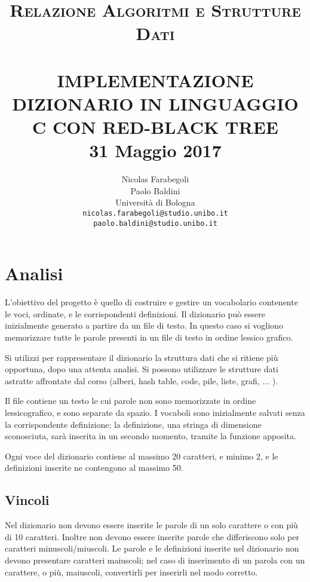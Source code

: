 \documentclass[paper=a4, fontsize=11pt,twoside]{scrartcl}   %
\title{ \normalsize \textsc{Relazione Algoritmi e Strutture Dati}    %
	\\[2.0cm]                               %
	\HRule{0.5pt} \\                        %
	\LARGE \textbf{\uppercase{Implementazione dizionario in linguaggio 
			C con Red-Black Tree}}    %
	\HRule{2pt} \\ [0.5cm]      %
	\normalsize 31 Maggio 2017          %
}
\author{
	Nicolas Farabegoli\\
	Paolo Baldini\\
	Università di Bologna\\  
	\texttt{nicolas.farabegoli@studio.unibo.it} \\
	\texttt{paolo.baldini@studio.unibo.it}\\
}
\makeatletter
\def\printtitle{%
	{\centering \@title\par}}
\def\printauthor{%
	{\centering \large \@author}}
\makeatother
\begin{document}
	\thispagestyle{empty}       %
	
	\printtitle                 %
	\vfill
	\printauthor                %
	\newpage
	
	\setcounter{page}{1}        %
	
	
	\section{Analisi}
		L'obiettivo del progetto è quello di costruire e gestire un vocabolario 
		contenente le voci, ordinate, e le corrispondenti definizioni. 
		Il dizionario può essere inizialmente generato a partire da un file di testo.  
		In questo caso si vogliono memorizzare tutte le parole presenti in un file di 
		testo in ordine lessico grafico.
		
		Si utilizzi per rappresentare il dizionario la struttura dati che si ritiene 
		più opportuna, dopo una attenta analisi. Si possono utilizzare le strutture 
		dati astratte affrontate dal corso (alberi, hash table, code, pile, liste, 
		grafi, ... ).
		
		Il file contiene un testo le cui parole non sono memorizzate in ordine lessicografico, e sono separate da spazio. I vocaboli sono inizialmente salvati senza la corrispondente definizione; la definizione, una stringa di dimensione sconosciuta, sarà inserita in un secondo momento, tramite la funzione apposita.
		
		Ogni voce del dizionario contiene al massimo 20 caratteri, e minimo 2, e le definizioni inserite ne contengono al massimo 50.
		
	\subsection{Vincoli}
		Nel dizionario non devono essere inserite le parole di un solo carattere o con più di 10 caratteri. Inoltre non devono essere inserite parole che differiscono solo per caratteri minuscoli/miuscoli. Le parole e le definizioni inserite nel dizionario non devono presentare caratteri maiuscoli; nel caso di inserimento di un parola con un carattere, o più, maiuscoli, convertirli per inserirli nel modo corretto. 
		
\end{document}
